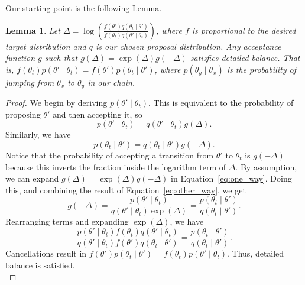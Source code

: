 \documentclass{article}
\newtheorem{lemma}{Lemma}
\begin{document}
Our starting point is the following Lemma.

\begin{lemma}\label{lem:detailed_balance}
Let $\Delta = \log \left(\frac{f(\theta') q(\theta_t \mid \theta')}{f(\theta_t) q(\theta'\mid
\theta_t)} \right)$, where $f$ is proportional to the desired target distribution and $q$ is our
chosen proposal distribution. Any acceptance function $g$ such that $g(\Delta) = \exp(\Delta)
g(-\Delta )$ satisfies detailed balance. That is, $f(\theta_t)p(\theta' \mid \theta_t) =
f(\theta')p(\theta_t \mid \theta')$, where $p(\theta_y \mid \theta_x)$ is the probability of jumping
from $\theta_x$ to $\theta_y$ in our chain.
\end{lemma}

\begin{proof}
We begin by deriving $p(\theta' \mid \theta_t)$. This is equivalent to the probability of proposing
$\theta'$ and then accepting it, so
\begin{equation}\label{eq:one_way}
p(\theta' \mid \theta_t) = q(\theta' \mid \theta_t)g(\Delta).
\end{equation}
Similarly, we have
\begin{equation}\label{eq:other_way}
p(\theta_t \mid \theta') = q(\theta_t \mid \theta')g(-\Delta).
\end{equation}
Notice that the probability of accepting a transition from $\theta'$ to $\theta_t$ is $g(-\Delta)$
because this inverts the fraction inside the logarithm term of $\Delta$.  By assumption, we can
expand $g(\Delta) = \exp(\Delta)g(-\Delta)$ in Equation~\ref{eq:one_way}.  Doing this, and combining
the result of Equation~\ref{eq:other_way}, we get
\begin{equation}\label{eq:combined}
g(-\Delta) = \frac{p(\theta' \mid \theta_t)}{q(\theta' \mid \theta_t)\exp(\Delta)} = \frac{p(\theta_t \mid \theta')}{q(\theta_t \mid \theta')}.
\end{equation}
Rearranging terms and expanding $\exp(\Delta)$, we have
\begin{equation}\label{eq:rearrange}
\frac{p(\theta' \mid \theta_t) f(\theta_t) q(\theta' \mid \theta_t)}{q(\theta' \mid \theta_t) f(\theta') q(\theta_t \mid \theta')} = \frac{p(\theta_t \mid \theta')}{ q(\theta_t \mid \theta')}.
\end{equation}
Cancellations result in $f(\theta') p(\theta_t \mid \theta') = f(\theta_t) p(\theta' \mid \theta_t)$. Thus, detailed balance is satisfied.\\
\end{proof}
\end{document}
